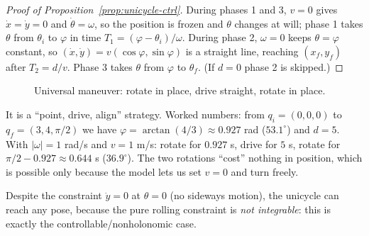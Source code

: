 \documentclass[11pt,a4paper]{article}
\theoremstyle{definition}
\theoremstyle{plain}
\theoremstyle{remark}
\begin{document}
\begin{proof}[Proof of Proposition~\ref{prop:unicycle-ctrl}]
During phases 1 and 3, $v=0$ gives $\dot x=\dot y=0$ and $\dot\theta=\omega$, so the position is frozen and $\theta$ changes at will; phase 1 takes $\theta$ from $\theta_i$ to $\varphi$ in time $T_1=(\varphi-\theta_i)/\omega$. During phase 2, $\omega=0$ keeps $\theta=\varphi$ constant, so $(\dot x,\dot y)=v(\cos\varphi,\sin\varphi)$ is a straight line, reaching $(x_f,y_f)$ after $T_2=d/v$. Phase 3 takes $\theta$ from $\varphi$ to $\theta_f$. (If $d=0$ phase 2 is skipped.)
\end{proof}

\begin{figure}[h]
\centering
{}
\caption{Universal maneuver: rotate in place, drive straight, rotate in place.}
\end{figure}

\begin{intuition}
It is a ``point, drive, align'' strategy. Worked numbers: from $q_i=(0,0,0)$ to $q_f=(3,4,\pi/2)$ we have $\varphi=\arctan(4/3)\approx0.927$ rad ($53.1^\circ$) and $d=5$. With $|\omega|=1$ rad/s and $v=1$ m/s: rotate for $0.927$ s, drive for $5$ s, rotate for $\pi/2-0.927\approx0.644$ s ($36.9^\circ$). The two rotations ``cost'' nothing in position, which is possible only because the model lets us set $v=0$ and turn freely.
\end{intuition}

\begin{intuition}
Despite the constraint $\dot y=0$ at $\theta=0$ (no sideways motion), the unicycle can reach any pose, because the pure rolling constraint is \emph{not integrable}: this is exactly the controllable/nonholonomic case.
\end{intuition}
\end{document}
